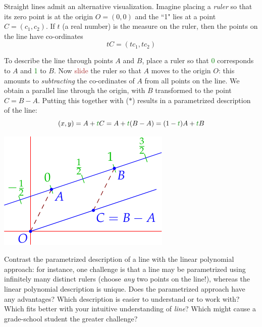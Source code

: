 Straight lines admit an alternative visualization. Imagine placing a \emph{ruler} so that its zero point is at the origin $O=(0,0)$ and the ``1" lies at a point $C=(c_1,c_2)$. If $t$ (a real number) is the measure on the ruler, then the points on the line have co-ordinates
\[
	tC=(tc_1,tc_2) \tag{$\ast$}
\]

\begin{minipage}[t]{0.65\linewidth}\vspace{-8pt}
	To describe the line through points $A$ and $B$, place a ruler so that \textcolor{Green}{0} corresponds to $A$ and \textcolor{Green}{1} to $B$. Now \textcolor{Brown}{slide} the ruler so that $A$ moves to the origin $O$: this amounts to \emph{subtracting} the co-ordinates of $A$ from all points on the line. We obtain a parallel line through the origin, with $B$ transformed to the point $C=B-A$. Putting this together with ($\ast$) results in a parametrized description of the line:
	\[
		(x,y) =A+\textcolor{Green}{t}C
		=A+\textcolor{Green}{t}(B-A)
		=(1-\textcolor{Green}{t})A+\textcolor{Green}{t}B
	\]
	\end{minipage}
	\hfill
	\begin{minipage}[t]{0.34\linewidth}\vspace{0pt}
		\flushright
		\includegraphics{line-line2}
	\end{minipage}\bigbreak


Contrast the parametrized description of a line with the linear polynomial approach: for instance, one challenge is that a line may be parametrized using infinitely many distinct rulers (choose \emph{any} two points on the line!), whereas the linear polynomial description is unique. Does the parametrized approach have any advantages? Which description is easier to understand or to work with? Which fits better with your intuitive understanding of \emph{line}? Which might cause a grade-school student the greater challenge?\smallbreak

